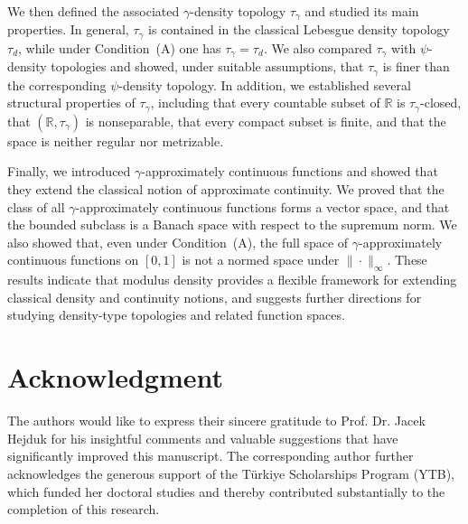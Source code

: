 \documentclass{amsart}
\theoremstyle{plain}
\numberwithin{equation}{section}
\begin{document}
We then defined the associated $\gamma$-density topology $\tau_\gamma$ and studied its main properties. In general, $\tau_\gamma$ is contained in the classical Lebesgue density topology $\tau_d$, while under Condition~(A) one has $\tau_\gamma=\tau_d$. We also compared $\tau_\gamma$ with $\psi$-density topologies and showed, under suitable assumptions, that $\tau_\gamma$ is finer than the corresponding $\psi$-density topology. In addition, we established several structural properties of $\tau_\gamma$, including that every countable subset of $\mathbb{R}$ is $\tau_\gamma$-closed, that $(\mathbb{R},\tau_\gamma)$ is nonseparable, that every compact subset is finite, and that the space is neither regular nor metrizable.

Finally, we introduced $\gamma$-approximately continuous functions and showed that they extend the classical notion of approximate continuity. We proved that the class of all $\gamma$-approximately continuous functions forms a vector space, and that the bounded subclass is a Banach space with respect to the supremum norm. We also showed that, even under Condition~(A), the full space of $\gamma$-approximately continuous functions on $[0,1]$ is not a normed space under $\|\cdot\|_\infty$. These results indicate that modulus density provides a flexible framework for extending classical density and continuity notions, and suggests further directions for studying density-type topologies and related function spaces.

\section*{Acknowledgment}
The authors would like to express their sincere gratitude to Prof. Dr. Jacek Hejduk for his insightful comments and valuable suggestions that have significantly improved this manuscript. The corresponding author further acknowledges the generous support of the Türkiye Scholarships Program (YTB), which funded her doctoral studies and thereby contributed substantially to the completion of this research.
\end{document}

